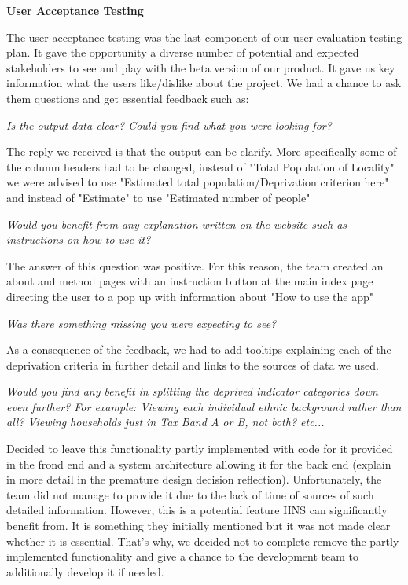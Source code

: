 \documentclass{l3proj}
\begin{document}
\textbf{User Acceptance Testing}

The user acceptance testing was the last component of our user evaluation testing plan. It gave the opportunity a diverse number of potential and expected stakeholders to see and play with the beta version of our product. It gave us key information what the users like/dislike about the project. We had a chance to ask them questions and get essential feedback such as:

\textit{Is the output data clear? Could you find what you were looking for?}

The reply we received is that the output can be clarify. More specifically some of the column headers had to be changed, instead of "Total Population of Locality" we were advised to use "Estimated total population/Deprivation criterion here" and instead of "Estimate" to use "Estimated number of people"

\textit{Would you benefit from any explanation written on the website such as instructions on how to use it?}

The answer of this question was positive. For this reason, the team created an about and method pages with an instruction button at the main index page directing the user to a pop up with information about "How to use the app"

\textit{Was there something missing you were expecting to see?}

As a consequence of the feedback, we had to add tooltips explaining each of the deprivation criteria in further detail and links to the sources of data we used.

\textit{Would you find any benefit in splitting the deprived indicator categories down even further? 
For example: Viewing each individual ethnic background rather than all? 
Viewing households just in Tax Band A or B, not both? etc...}

Decided to leave this functionality partly implemented with code for it provided in the frond end and a system architecture allowing it for the back end (explain in more detail in the premature design decision reflection). Unfortunately, the team did not manage to provide it due to the lack of time of sources of such detailed information. However, this is a potential feature HNS can significantly benefit from. It is something they initially mentioned but it was not made clear whether it is essential. That's why, we decided not to complete remove the partly implemented functionality and give a chance to the development team to additionally develop it if needed.
\end{document}
